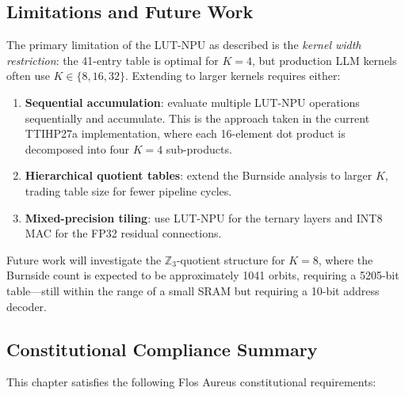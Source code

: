 \subsection{Limitations and Future Work}
\label{subsec:limitations}

The primary limitation of the LUT-NPU as described is the \emph{kernel
width restriction}: the 41-entry table is optimal for \(K=4\), but
production LLM kernels often use \(K \in \{8, 16, 32\}\).  Extending
to larger kernels requires either:
\begin{enumerate}
  \item \textbf{Sequential accumulation}: evaluate multiple LUT-NPU
        operations sequentially and accumulate.  This is the approach
        taken in the current TTIHP27a implementation, where each
        16-element dot product is decomposed into four \(K=4\)
        sub-products.
  \item \textbf{Hierarchical quotient tables}: extend the Burnside
        analysis to larger \(K\), trading table size for fewer pipeline
        cycles.
  \item \textbf{Mixed-precision tiling}: use LUT-NPU for the ternary
        layers and INT8 MAC for the FP32 residual connections.
\end{enumerate}

Future work will investigate the \(\mathbb{Z}_3\)-quotient structure
for \(K=8\), where the Burnside count is expected to be approximately
1041 orbits, requiring a 5205-bit table---still within the range of a
small SRAM but requiring a 10-bit address decoder.

\subsection{Constitutional Compliance Summary}
\label{subsec:constitution}

This chapter satisfies the following Flos Aureus constitutional
requirements:

